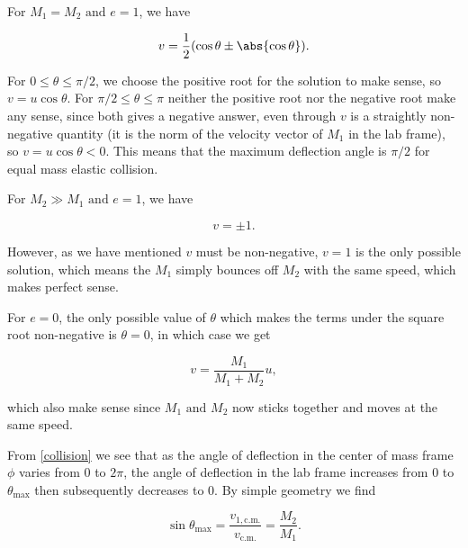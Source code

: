 {For \(M_1 =M_2 \text { and } e = 1\), we have 

\begin{equation}
	v = \frac{1}{2} (\cos \theta \pm \abs{\cos \theta } ).
\end{equation}

For \(0 \le  \theta \le  \pi /2\), we choose the positive root for the solution to make sense, so \(v = u \cos \theta \). For \(\pi /2 \le  \theta \le  \pi \) neither the positive root nor the negative root make any sense, since both gives a negative answer, even through \(v\) is a straightly non-negative quantity (it is the norm of the velocity vector of \(M_1 \) in the lab frame), so \(v = u\cos \theta < 0\). This means that the maximum deflection angle is \(\pi /2\) for equal mass elastic collision. 

For \(M_2 \gg M_1 \text { and } e =1\), we have 

\begin{equation}
	v = \pm 1.
\end{equation}

However, as we have mentioned \(v\) must be non-negative, \(v = 1\) is the only possible solution, which means the \(M_1 \) simply bounces off \(M_2 \) with the same speed, which makes perfect sense.

For \(e = 0\), the only possible value of \(\theta \) which makes the terms under the square root non-negative is \(\theta  = 0\), in which case we get 

\begin{equation}
	v = \frac{M_1 }{M_1 + M_2 } u, 
\end{equation}

which also make sense since \(M_1 \text { and } M_2 \) now sticks together and moves at the same speed. 

From \cref{collision} we see that as the angle of deflection in the center of mass frame \(\phi \) varies from \(0 \) to \(2\pi \), the angle of deflection in the lab frame increases from \(0\) to \(\theta _{\text{max} } \) then subsequently decreases to \(0\). By simple geometry we find 

\begin{equation}
	\sin \theta _{\text{max} } = \frac{v_{1,\text{c.m.} } }{v_{\text{c.m.} } }  = \frac{M_2 }{M_1 }.  
\end{equation}
~
} 


